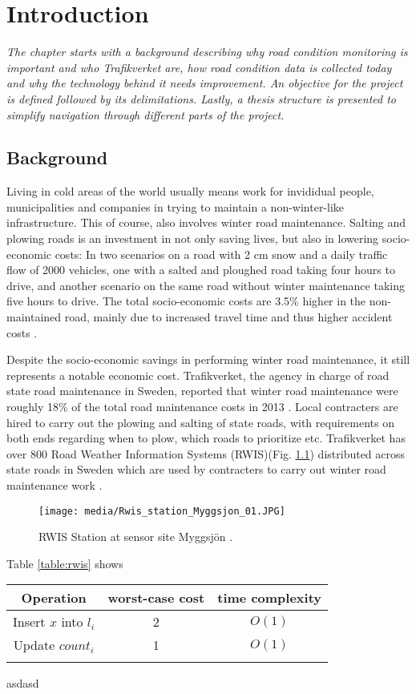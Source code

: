 \chapter{Introduction}
\emph{The chapter starts with a background describing why road condition monitoring is important and who Trafikverket are, how road condition data is collected today and why the technology behind it needs improvement. An objective for the project is defined followed by its delimitations. Lastly, a thesis structure is presented to simplify navigation through different parts of the project.}

\section{Background}
	Living in cold areas of the world usually means work for invididual people, municipalities and companies in trying to maintain a non-winter-like infrastructure. This of course, also involves winter road maintenance. Salting and plowing roads is an investment in not only saving lives, but also in lowering socio-economic costs: In two scenarios on a road with 2 cm snow and a daily traffic flow of 2000 vehicles, one with a salted and ploughed road taking four hours to drive, and another scenario on the same road without winter maintenance taking five hours to drive. The total socio-economic costs are 3.5\% higher in the non-maintained road, mainly due to increased travel time and thus higher accident costs \cite{ARTICLE:1}. 

	Despite the socio-economic savings in performing winter road maintenance, it still represents a notable economic cost. Trafikverket, the agency in charge of road state road maintenance in Sweden, reported that winter road maintenance were roughly 18\% of the total road maintenance costs in 2013 \cite{REPORT:1}. Local contracters are hired to carry out the plowing and salting of state roads, with requirements on both ends regarding when to plow, which roads to prioritize etc. Trafikverket has over 800 Road Weather Information Systems (RWIS)(Fig. \ref{img:rwis}) distributed across state roads in Sweden which are used by contracters to carry out winter road maintenance work \cite{WEBSITE:2}. 
\begin{figure}[H]
	\centering
	\texttt{[image: media/Rwis\_station\_Myggsjon\_01.JPG]}
	\caption{RWIS Station at sensor site Myggsjön \cite{IMAGE:1}.}
	\label{img:rwis}
\end{figure}
Table \ref{table:rwis} shows
\begin{tabular}[3]{c | c | c}
    	Operation & worst-case cost & time complexity \\
    	\hline
    	Insert $x$ into $l_i$ & 2 & $O(1)$  \\
   	Update $count_i$ & 1 &$O(1)$ \\
	\label{table:rwis}
\end{tabular}
asdasd

